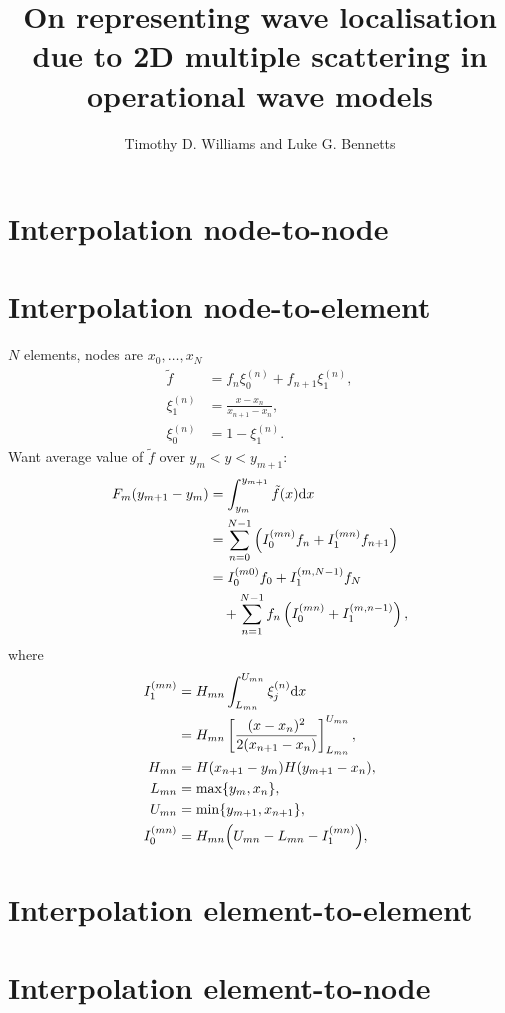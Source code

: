 \documentclass[a4paper,10pt]{article}
\title{On representing wave localisation due to 2D multiple scattering in operational wave models}
\author{Timothy D. Williams and Luke G. Bennetts}
\def\rmd{{\rm d}}
\begin{document}
\maketitle



\section{Interpolation node-to-node}
\section{Interpolation node-to-element}
$N$ elements, nodes are $x_0,\ldots,x_N$
\begin{subequations}
\begin{align}
\tilde f&=f_n\xi_0^{(n)}+f_{n+1}\xi_1^{(n)},\\
\xi_1^{(n)}&=\frac{x-x_n}{x_{n+1}-x_n},\\
\xi_0^{(n)}&=1-\xi_1^{(n)}.
\end{align}
\end{subequations}
Want average value of $\tilde f$ over $y_m<y<y_{m+1}$:
\begin{align}
F_m(y_{m+1}-y_m)
&=\int_{y_m}^{y_{m+1}}\tilde f(x)\rmd x\notag\\
&=\sum_{n=0}^{N-1}
\left(I_0^{(mn)}f_n+I_1^{(mn)}f_{n+1}\right)\notag\\
&=I_0^{(m0)}f_0+I_1^{(m,N-1)}f_N\notag\\
&\quad+\sum_{n=1}^{N-1}f_n\left(I_0^{(mn)}+I_1^{(m,n-1)}\right)
,
\end{align}
where
\begin{subequations}
\begin{align}
I_1^{(mn)}&=H_{mn}\int_{L_{mn}}^{U_{mn}}\xi_j^{(n)}\rmd x\notag\\
&=H_{mn}\left[\frac{(x-x_n)^2}{2(x_{n+1}-x_n)}\right]^{U_{mn}}_{L_{mn}},\\
H_{mn}&=H(x_{n+1}-y_m)H(y_{m+1}-x_n),\\
L_{mn}&=\max\{y_m,x_n\},\\
U_{mn}&=\min\{y_{m+1},x_{n+1}\},\\
I_0^{(mn)}&=H_{mn}\Big(U_{mn}-L_{mn}-I_1^{(mn)}\Big),
\end{align}
\end{subequations}

\section{Interpolation element-to-element}
\section{Interpolation element-to-node}


\end{document}
